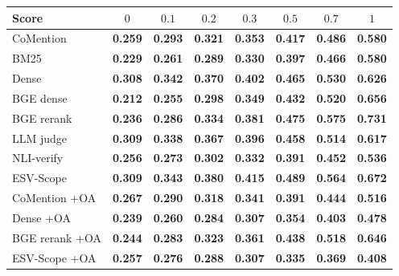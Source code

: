 \setlength{\tabcolsep}{2.5pt}
\begin{tabular}{lccccccc}
\toprule
Score & $0$ & $0.1$ & $0.2$ & $0.3$ & $0.5$ & $0.7$ & $1$ \\
\midrule
CoMention & \textbf{0.259} & \textbf{0.293} & \textbf{0.321} & \textbf{0.353} & \textbf{0.417} & \textbf{0.486} & \textbf{0.580} \\
BM25 & \textbf{0.229} & \textbf{0.261} & \textbf{0.289} & \textbf{0.330} & \textbf{0.397} & \textbf{0.466} & \textbf{0.580} \\
Dense & \textbf{0.308} & \textbf{0.342} & \textbf{0.370} & \textbf{0.402} & \textbf{0.465} & \textbf{0.530} & \textbf{0.626} \\
BGE dense & \textbf{0.212} & \textbf{0.255} & \textbf{0.298} & \textbf{0.349} & \textbf{0.432} & \textbf{0.520} & \textbf{0.656} \\
BGE rerank & \textbf{0.236} & \textbf{0.286} & \textbf{0.334} & \textbf{0.381} & \textbf{0.475} & \textbf{0.575} & \textbf{0.731} \\
LLM judge & \textbf{0.309} & \textbf{0.338} & \textbf{0.367} & \textbf{0.396} & \textbf{0.458} & \textbf{0.514} & \textbf{0.617} \\
NLI-verify & \textbf{0.256} & \textbf{0.273} & \textbf{0.302} & \textbf{0.332} & \textbf{0.391} & \textbf{0.452} & \textbf{0.536} \\
ESV-Scope & \textbf{0.309} & \textbf{0.343} & \textbf{0.380} & \textbf{0.415} & \textbf{0.489} & \textbf{0.564} & \textbf{0.672} \\
\midrule
CoMention +OA & \textbf{0.267} & \textbf{0.290} & \textbf{0.318} & \textbf{0.341} & \textbf{0.391} & \textbf{0.444} & \textbf{0.516} \\
Dense +OA & \textbf{0.239} & \textbf{0.260} & \textbf{0.284} & \textbf{0.307} & \textbf{0.354} & \textbf{0.403} & \textbf{0.478} \\
BGE rerank +OA & \textbf{0.244} & \textbf{0.283} & \textbf{0.323} & \textbf{0.361} & \textbf{0.438} & \textbf{0.518} & \textbf{0.646} \\
ESV-Scope +OA & \textbf{0.257} & \textbf{0.276} & \textbf{0.288} & \textbf{0.307} & \textbf{0.335} & \textbf{0.369} & \textbf{0.408} \\
\bottomrule
\end{tabular}

